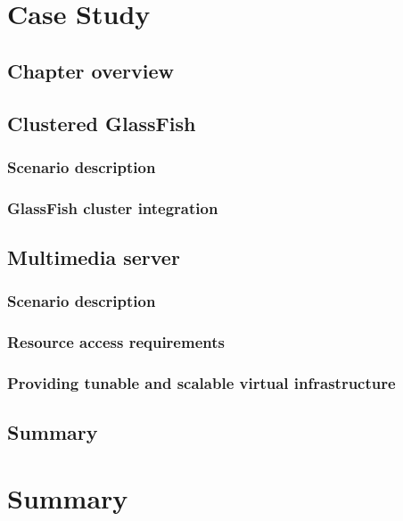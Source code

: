 \documentclass[11pt]{book}
\begin{document}
  \chapter{Case Study}

    \section{Chapter overview}

    \section{Clustered GlassFish}

      \subsection{Scenario description}

      \subsection{GlassFish cluster integration}


    \section{Multimedia server}

      \subsection{Scenario description}

      \subsection{Resource access requirements}

      \subsection{Providing tunable and scalable virtual infrastructure}


    \section{Summary}


  \chapter{Summary}
\end{document}
